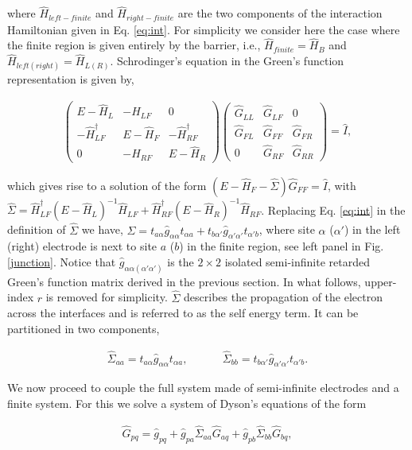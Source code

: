 \documentclass[10pt,prb,showpacs,amssymb,floatfix]{revtex4-1}
\newcommand{\dg}{\dagger}
\newcommand{\alp}{\alpha}
\newcommand{\Sg}{\Sigma}
\newcommand{\h}{\hat}
\begin{document}
where $\h H_{left-finite}$ and $\h H_{right-finite}$ are the two components of the interaction Hamiltonian given in Eq. \eqref{eq:int}. For simplicity we consider here the case where the finite region is given entirely by the barrier, i.e., $\h H_{finite}=\h H_B$ and $\h H_{left (right)} = \h H_{L(R)}$. Schrodinger's equation in the Green's function representation is given by,

\begin{align}
\left(\begin{matrix}
E- \h H_L & -\h H_{LF} & 0 \\
-\h H^\dagger_{LF} & E- \hat H_F & -\h H_{RF}^\dagger \\
0 & -\h H_{RF} & E- \h H_{R} 
\end{matrix} \right) 
\left(\begin{matrix}
\h G_{LL} & \h G_{LF} & 0 \\
\h G_{FL} & \hat G_{FF} & \h G_{FR} \\
0 & \h G_{RF} & \h G_{RR} 
\end{matrix} \right) 
= \h I,
\label{blockgf}
\end{align}

which gives rise to a solution of the form $(E-\h H_{F} - \h \Sg)\h G_{FF}= \h I$, with $\h \Sg = \h H_{LF}^\dg(E-\h H_L)^{-1} \h H_{LF} + \h H_{RF}^\dg (E-\h H_R)^{-1} \h H_{RF}$. Replacing Eq. \eqref{eq:int} in the definition of $\h \Sg$ we have, $\h \Sg = t_{a\alp} \h g_{\alp\alp} t_{\alp a} + t_{b\alp'} \h g_{\alp'\alp'}t_{\alp' b}$, where site $\alp$ ($\alp'$) in the left (right) electrode is next to site  $a$ ($b$) in the finite region, see left panel in Fig. \ref{junction}. Notice that $\h g_{\alp\alp(\alp'\alp')}$ is the $2\times2$ isolated semi-infinite retarded Green's function matrix derived in the previous section. In what follows, upper-index $r$ is removed for simplicity. $\h \Sg$ describes the propagation of the electron across the interfaces and is referred to as the self energy term. It can be partitioned in two components,

\begin{align}
\label{selfleft}
{\hat \Sg}_{aa}=t_{a\alp}\h g_{\alp\alp}t_{\alp a}, ~~~~~~~~~~~~~~{\hat \Sg}_{bb}=t_{b\alp'} \h g_{\alp'\alp'}t_{\alp'b}.
\end{align}

We now proceed to couple the full system made of semi-infinite electrodes and a finite system. For this we solve a system of Dyson's equations of the form

\begin{align}
{\hat G}_{pq}={\hat g}_{pq}+{\hat g}_{pa}{\hat \Sg}_{aa}{\hat G}_{aq}+{\hat g}_{pb}{\hat \Sg}_{bb}{\hat G}_{bq},
\label{eq:dyson}
\end{align}
\end{document}
